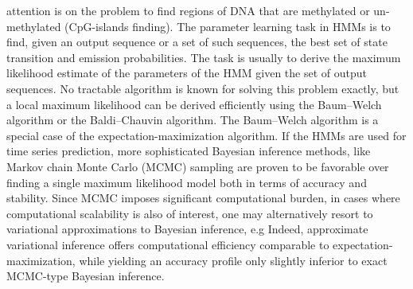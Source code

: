 \documentclass{article}
\begin{document}
attention is on the problem to find regions of DNA that are methylated or un-methylated (CpG-islands finding).
The parameter learning task in HMMs is to find, given an output sequence or a set of such sequences, the best set of state transition and emission probabilities. The task is usually to derive the maximum likelihood estimate of the parameters of the HMM given the set of output sequences. No tractable algorithm is known for solving this problem exactly, but a local maximum likelihood can be derived efficiently using the Baum–Welch algorithm or the Baldi–Chauvin algorithm. The Baum–Welch algorithm is a special case of the expectation-maximization algorithm. If the HMMs are used for time series prediction, more sophisticated Bayesian inference methods, like Markov chain Monte Carlo (MCMC) sampling are proven to be favorable over finding a single maximum likelihood model both in terms of accuracy and stability. Since MCMC imposes significant computational burden, in cases where computational scalability is also of interest, one may alternatively resort to variational approximations to Bayesian inference, e.g Indeed, approximate variational inference offers computational efficiency comparable to expectation-maximization, while yielding an accuracy profile only slightly inferior to exact MCMC-type Bayesian inference.
\end{document}
